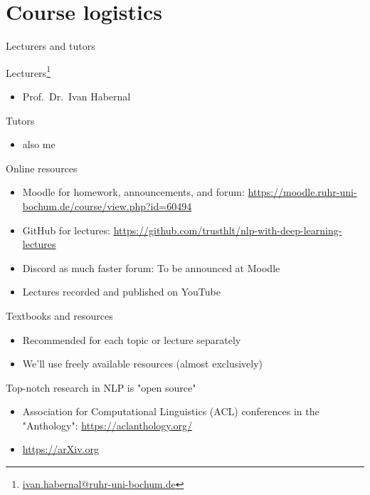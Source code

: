 \documentclass[12pt,aspectratio=169,handout]{beamer}
\begin{document}
\section{Course logistics}


\begin{frame}{Lecturers and tutors}

Lecturers\footnote{\url{ivan.habernal@ruhr-uni-bochum.de}}

\begin{itemize}
	\item Prof.\ Dr.\ Ivan Habernal
\end{itemize}

Tutors

\begin{itemize}
	\item also me
\end{itemize}

\end{frame}



\begin{frame}{Online resources}
	
\begin{itemize}
	\item Moodle for homework, announcements, and forum: \url{https://moodle.ruhr-uni-bochum.de/course/view.php?id=60494}
	\item GitHub for lectures: \url{https://github.com/trusthlt/nlp-with-deep-learning-lectures}
	\item Discord as much faster forum: To be announced at Moodle
	\item Lectures recorded and published on YouTube
\end{itemize}
	
\end{frame}

\begin{frame}{Textbooks and resources}
	
\begin{itemize}
	\item Recommended for each topic or lecture separately
	\item We'll use freely available resources (almost exclusively)
\end{itemize}

Top-notch research in NLP is "open source"

\begin{itemize}
	\item Association for Computational Linguistics (ACL) conferences in the "Anthology": \url{https://aclanthology.org/}
	\item \url{https://arXiv.org}
\end{itemize}
	
\end{frame}
\end{document}
